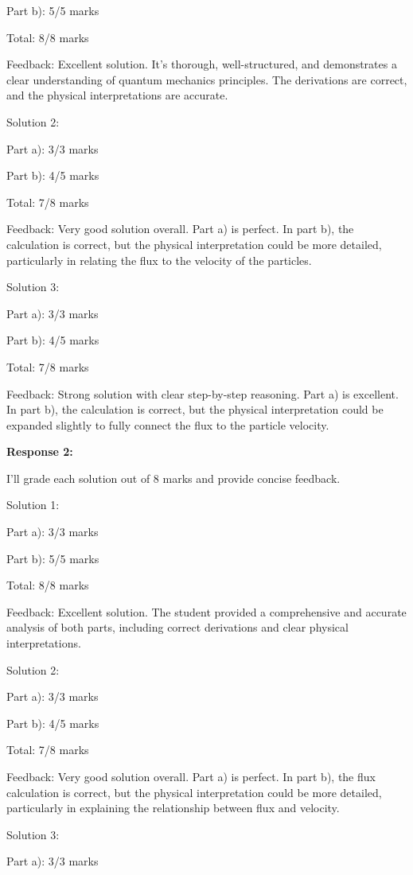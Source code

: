 \documentclass[a4paper,11pt]{article}
\begin{document}
Part b): 5/5 marks

Total: 8/8 marks

Feedback: Excellent solution. It's thorough, well-structured, and demonstrates a clear understanding of quantum mechanics principles. The derivations are correct, and the physical interpretations are accurate.

Solution 2:

Part a): 3/3 marks

Part b): 4/5 marks

Total: 7/8 marks

Feedback: Very good solution overall. Part a) is perfect. In part b), the calculation is correct, but the physical interpretation could be more detailed, particularly in relating the flux to the velocity of the particles.

Solution 3:

Part a): 3/3 marks

Part b): 4/5 marks

Total: 7/8 marks

Feedback: Strong solution with clear step-by-step reasoning. Part a) is excellent. In part b), the calculation is correct, but the physical interpretation could be expanded slightly to fully connect the flux to the particle velocity.

\bigskip
\textbf{Response 2:}

I'll grade each solution out of 8 marks and provide concise feedback.

Solution 1:

Part a): 3/3 marks

Part b): 5/5 marks

Total: 8/8 marks

Feedback: Excellent solution. The student provided a comprehensive and accurate analysis of both parts, including correct derivations and clear physical interpretations.

Solution 2:

Part a): 3/3 marks

Part b): 4/5 marks

Total: 7/8 marks

Feedback: Very good solution overall. Part a) is perfect. In part b), the flux calculation is correct, but the physical interpretation could be more detailed, particularly in explaining the relationship between flux and velocity.

Solution 3:

Part a): 3/3 marks
\end{document}

